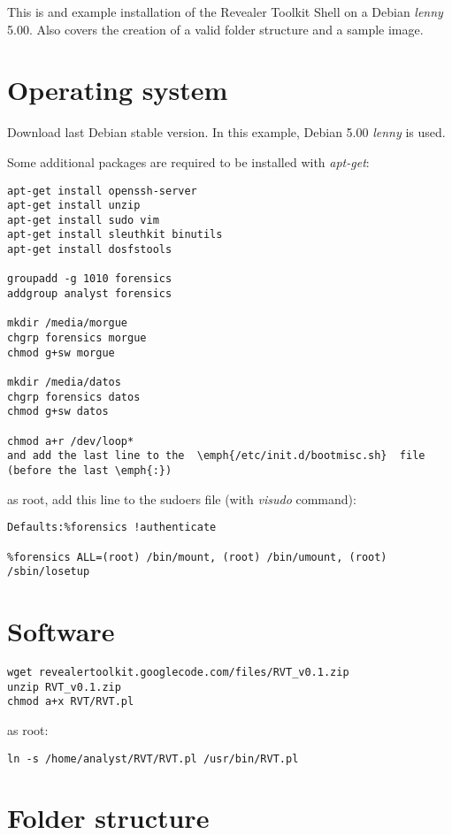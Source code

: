 \documentclass[a4paper,11pt,oneside]{report}
\begin{document}
This is and example installation of the Revealer Toolkit Shell on a Debian \emph{lenny} 5.00. Also covers the creation of a valid folder structure and a sample image.

\section{Operating system}

Download last Debian stable version. In this example, Debian 5.00 \emph{lenny} is used.

Some additional packages are required to be installed with \emph{apt-get}:

\begin{verbatim}
apt-get install openssh-server
apt-get install unzip
apt-get install sudo vim
apt-get install sleuthkit binutils
apt-get install dosfstools

groupadd -g 1010 forensics
addgroup analyst forensics

mkdir /media/morgue
chgrp forensics morgue
chmod g+sw morgue

mkdir /media/datos
chgrp forensics datos
chmod g+sw datos

chmod a+r /dev/loop*
and add the last line to the  \emph{/etc/init.d/bootmisc.sh}  file (before the last \emph{:})
\end{verbatim}


as root, add this line to the sudoers file (with \emph{visudo} command):

\begin{verbatim}
Defaults:%forensics !authenticate

%forensics ALL=(root) /bin/mount, (root) /bin/umount, (root) /sbin/losetup
\end{verbatim}


\section{Software}

\begin{verbatim}
wget revealertoolkit.googlecode.com/files/RVT_v0.1.zip
unzip RVT_v0.1.zip
chmod a+x RVT/RVT.pl
\end{verbatim}

as root:

\begin{verbatim}
ln -s /home/analyst/RVT/RVT.pl /usr/bin/RVT.pl
\end{verbatim}


\section{Folder structure}
\end{document}

